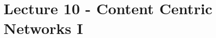 \section{Lecture 10 - Content Centric Networks I} %
\label{sec:lecture_10_content_centric_networks_1}

